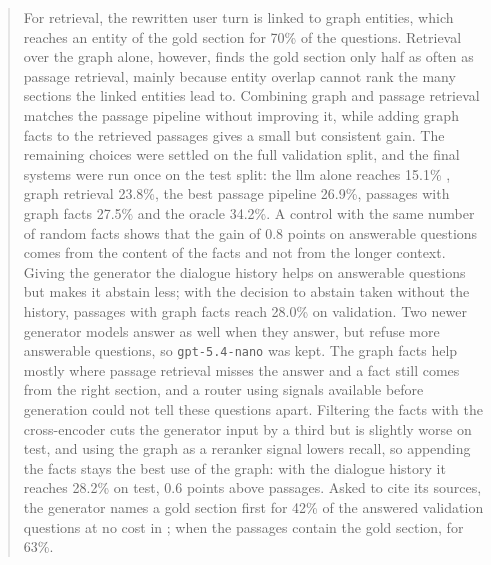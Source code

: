 \begin{abstract}
For retrieval, the rewritten user turn is linked to graph entities, which reaches an
entity of the gold section for 70\% of the questions. Retrieval over the graph alone,
however, finds the gold section only half as often as passage retrieval, mainly because
entity overlap cannot rank the many sections the linked entities lead to. Combining
graph and passage retrieval matches the passage pipeline without improving it, while
adding graph facts to the retrieved passages gives a small but consistent gain. The
remaining choices were settled on the full validation split, and the final systems were
run once on the test split: the \gls{llm} alone reaches 15.1\% \fone{}, graph retrieval
23.8\%, the best passage pipeline 26.9\%, passages with graph facts 27.5\% and the oracle
34.2\%. A control with the same number of random facts shows that the gain of 0.8 points
on answerable questions comes from the content of the facts and not from the longer
context. Giving the generator the dialogue history helps on answerable questions but makes
it abstain less; with the decision to abstain taken without the history, passages with
graph facts reach 28.0\% on validation. Two newer generator models answer as well when they
answer, but refuse more answerable questions, so \texttt{gpt-5.4-nano} was kept. The graph facts help mostly where passage retrieval misses
the answer and a fact still comes from the right section, and a router using signals
available before generation could not tell these questions apart. Filtering the facts with the
cross-encoder cuts the generator input by a third but is slightly worse on test, and using the graph as a
reranker signal lowers recall, so appending the facts stays the best use of the graph: with
the dialogue history it reaches 28.2\% on test, 0.6 points above passages. Asked to cite its sources, the generator names a gold
section first for 42\% of the answered validation questions at no cost in \fone{}; when the
passages contain the gold section, for 63\%.

\end{abstract}
